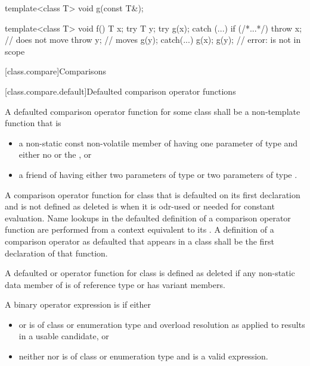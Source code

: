 \pnum
\begin{example}
\begin{codeblock}
template<class T> void g(const T&);

template<class T> void f() {
  T x;
  try {
    T y;
    try { g(x); }
    catch (...) {
      if (/*...*/)
        throw x;        // does not move
      throw y;          // moves
    }
    g(y);
  } catch(...) {
    g(x);
    g(y);               // error:  is not in scope
  }
}
\end{codeblock}
\end{example}

[class.compare]{Comparisons}%

[class.compare.default]{Defaulted comparison operator functions}%

\pnum
A defaulted comparison operator function
for some class 
shall be a non-template function
that is
\begin{itemize}
\item
a non-static const non-volatile member of  having
one parameter of type  and either
no  or
the  \tcode{\&}, or

\item
a friend of  having either
two parameters of type  or
two parameters of type .
\end{itemize}
A comparison operator function for class  that
is defaulted on its first declaration and
is not defined as deleted is
when it is odr-used or needed for constant evaluation.
Name lookups in the defaulted definition
of a comparison operator function
are performed from a context equivalent to
its .
A definition of a comparison operator as
defaulted that appears in a class shall be the first declaration
of that function.

\pnum
A defaulted \tcode{<=>} or \tcode{==} operator function for class 
%
%
is defined as deleted if
any non-static data member of  is of reference type or
 has variant members.

\pnum
A binary operator expression  is
if either
\begin{itemize}
\item
{} or  is of class or enumeration type and
overload resolution as applied to 
results in a usable candidate, or

\item
neither  nor  is of class or enumeration type and
 is a valid expression.
\end{itemize}

